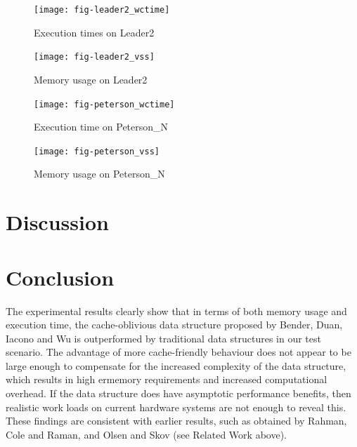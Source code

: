 \documentclass{acm_proc_article-sp}
\begin{document}
\begin{figure}
\centering
\texttt{[image: fig-leader2\_wctime]}
\caption{Execution times on Leader2}
\label{fig-leader2_wctime}
\end{figure}

\begin{figure}
\centering
\texttt{[image: fig-leader2\_vss]}
\caption{Memory usage on Leader2}
\label{leader2_vss}
\end{figure}

\begin{figure}
\centering
\texttt{[image: fig-peterson\_wctime]}
\caption{Execution time on Peterson\_N}
\label{fig-peterson_wctime}
\end{figure}

\begin{figure}
\centering
\texttt{[image: fig-peterson\_vss]}
\caption{Memory usage on Peterson\_N}
\label{fig-peterson_vss}
\end{figure}

%
%


\section{Discussion}

\section{Conclusion}
The experimental results clearly show that in terms of both memory usage and
execution time, the cache-oblivious data structure proposed by Bender, Duan,
Iacono and Wu is outperformed by traditional data structures in our test scenario.
The advantage of more cache-friendly behaviour does not appear to be large enough
to compensate for the increased complexity of the data structure, which results in
high ermemory requirements and increased computational overhead.
If the data structure does have asymptotic performance benefits, then realistic
work loads on current hardware systems are not enough to reveal this.
These findings are consistent with earlier results, such as obtained by
Rahman, Cole and Raman, and Olsen and Skov (see Related Work above).
\end{document}
